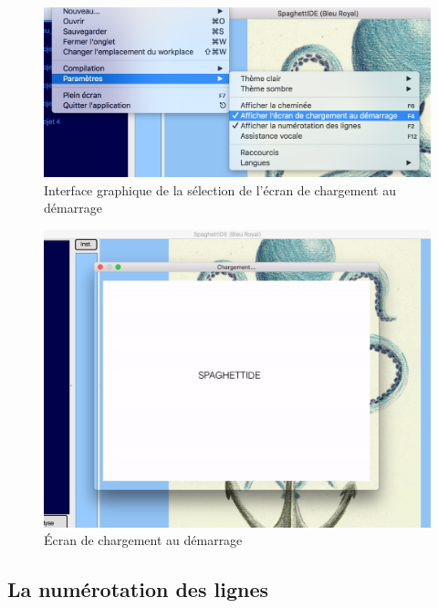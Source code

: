 \documentclass[a4paper,12pt]{article}
\begin{document}
\begin{figure}[h!]
			\begin{center}
				\includegraphics[scale=0.6]{images/selection_loading.png}
				\caption{Interface graphique de la sélection de l'écran de chargement au démarrage}
			\end{center}
		\end{figure}
		
\newpage

\begin{figure}[h!]
			\begin{center}
				\includegraphics[scale=0.5]{images/loading.png}
				\caption{Écran de chargement au démarrage}
			\end{center}
		\end{figure}
		
\subsection{La numérotation des lignes}
\end{document}
